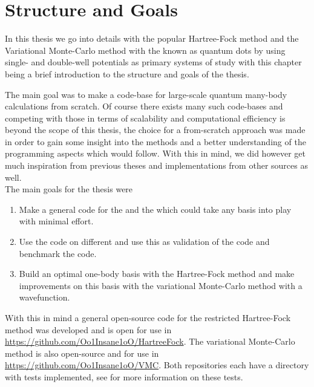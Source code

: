 \section{Structure and Goals\label{sec:structure_and_goals}}
    In this thesis we go into details with the popular Hartree-Fock method and
    the Variational Monte-Carlo method with the  known
    as quantum dots by using single- and double-well potentials as primary
    systems of study with this chapter being a brief introduction to the
    structure and goals of the thesis.

    The main goal was to make a code-base for large-scale quantum many-body
    calculations from scratch. Of course there exists many such code-bases and
    competing with those in terms of scalability and computational efficiency
    is beyond the scope of this thesis, the choice for a from-scratch approach
    was made in order to gain some insight into the methods and a better
    understanding of the programming aspects which would follow. With this in
    mind, we did however get much inspiration from previous theses and
    implementations from other sources as well. \\
    The main goals for the thesis were
        \begin{enumerate}
            \item Make a general \CC code for the 
                and the  which could take
                any basis into play with minimal effort.
            \item Use the \CC code on different  and use this as validation of the code and
                benchmark the code.
            \item Build an optimal one-body basis with the Hartree-Fock method
                and make improvements on this basis with the variational
                Monte-Carlo method with a  wavefunction.
        \end{enumerate}
    With this in mind a general open-source code for the restricted
    Hartree-Fock method was developed and is open for use in
    \url{https://github.com/Oo1Insane1oO/HartreeFock}. The variational
    Monte-Carlo method is also open-source and for use in
    \url{https://github.com/Oo1Insane1oO/VMC}. Both repositories each have a
    directory with tests implemented, see  for more
    information on these tests. \\
